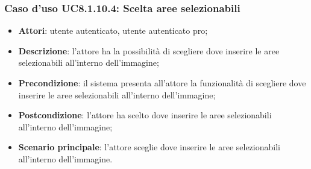 \subsubsection{Caso d'uso UC8.1.10.4: Scelta aree selezionabili}
\begin{itemize}
	\item \textbf{Attori}: utente autenticato, utente autenticato pro;
	\item \textbf{Descrizione}: l'attore ha la possibilità di scegliere dove inserire le aree selezionabili all'interno dell'immagine;
	\item \textbf{Precondizione}: il sistema presenta all'attore la funzionalità di scegliere dove inserire le aree selezionabili all'interno dell'immagine; 	
	\item \textbf{Postcondizione}: l'attore ha scelto dove inserire le aree selezionabili all'interno dell'immagine;
	\item \textbf{Scenario principale}: l'attore sceglie dove inserire le aree selezionabili all'interno dell'immagine. 	
\end{itemize}

